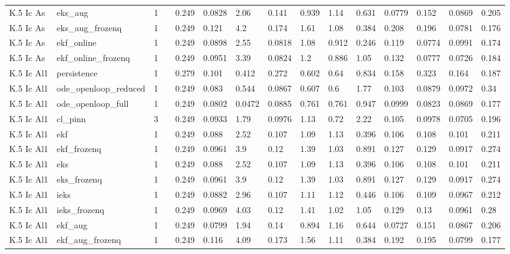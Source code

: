 \begin{table}[t]
\begin{tabular}{lllllllllllllll}
K.5 Ic As & eks\_aug & 1 &  & 0.249 & 0.0828 & 2.06 & 0.141 & 0.939 & 1.14 & 0.631 & 0.0779 & 0.152 & 0.0869 & 0.205 \\
K.5 Ic As & eks\_aug\_frozenq & 1 &  & 0.249 & 0.121 & 4.2 & 0.174 & 1.61 & 1.08 & 0.384 & 0.208 & 0.196 & 0.0781 & 0.176 \\
K.5 Ic As & ekf\_online & 1 &  & 0.249 & 0.0898 & 2.55 & 0.0818 & 1.08 & 0.912 & 0.246 & 0.119 & 0.0774 & 0.0991 & 0.174 \\
K.5 Ic As & ekf\_online\_frozenq & 1 &  & 0.249 & 0.0951 & 3.39 & 0.0824 & 1.2 & 0.886 & 1.05 & 0.132 & 0.0777 & 0.0726 & 0.184 \\
K.5 Ic Al1 & persistence & 1 &  & 0.279 & 0.101 & 0.412 & 0.272 & 0.602 & 0.64 & 0.834 & 0.158 & 0.323 & 0.164 & 0.187 \\
K.5 Ic Al1 & ode\_openloop\_reduced & 1 &  & 0.249 & 0.083 & 0.544 & 0.0867 & 0.607 & 0.6 & 1.77 & 0.103 & 0.0879 & 0.0972 & 0.34 \\
K.5 Ic Al1 & ode\_openloop\_full & 1 &  & 0.249 & 0.0802 & 0.0472 & 0.0885 & 0.761 & 0.761 & 0.947 & 0.0999 & 0.0823 & 0.0869 & 0.177 \\
K.5 Ic Al1 & cl\_pinn & 3 &  & 0.249 & 0.0933 & 1.79 & 0.0976 & 1.13 & 0.72 & 2.22 & 0.105 & 0.0978 & 0.0705 & 0.196 \\
K.5 Ic Al1 & ekf & 1 &  & 0.249 & 0.088 & 2.52 & 0.107 & 1.09 & 1.13 & 0.396 & 0.106 & 0.108 & 0.101 & 0.211 \\
K.5 Ic Al1 & ekf\_frozenq & 1 &  & 0.249 & 0.0961 & 3.9 & 0.12 & 1.39 & 1.03 & 0.891 & 0.127 & 0.129 & 0.0917 & 0.274 \\
K.5 Ic Al1 & eks & 1 &  & 0.249 & 0.088 & 2.52 & 0.107 & 1.09 & 1.13 & 0.396 & 0.106 & 0.108 & 0.101 & 0.211 \\
K.5 Ic Al1 & eks\_frozenq & 1 &  & 0.249 & 0.0961 & 3.9 & 0.12 & 1.39 & 1.03 & 0.891 & 0.127 & 0.129 & 0.0917 & 0.274 \\
K.5 Ic Al1 & ieks & 1 &  & 0.249 & 0.0882 & 2.96 & 0.107 & 1.11 & 1.12 & 0.446 & 0.106 & 0.109 & 0.0967 & 0.212 \\
K.5 Ic Al1 & ieks\_frozenq & 1 &  & 0.249 & 0.0969 & 4.03 & 0.12 & 1.41 & 1.02 & 1.05 & 0.129 & 0.13 & 0.0961 & 0.28 \\
K.5 Ic Al1 & ekf\_aug & 1 &  & 0.249 & 0.0799 & 1.94 & 0.14 & 0.894 & 1.16 & 0.644 & 0.0727 & 0.151 & 0.0867 & 0.206 \\
K.5 Ic Al1 & ekf\_aug\_frozenq & 1 &  & 0.249 & 0.116 & 4.09 & 0.173 & 1.56 & 1.11 & 0.384 & 0.192 & 0.195 & 0.0799 & 0.177 \\

\end{tabular}
\end{table}

